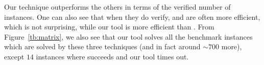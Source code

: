 Our technique outperforms the others in terms of the verified number of instances. One can also see that when they do verify, \deeppoly{} and \kpoly{} are often more efficient, which is not surprising, while our tool is more efficient than \deepsrgr{}. From Figure~\ref{tb:matrix}, we also see  that our tool solves all the benchmark instances which are solved by these three techniques (and in fact around $\sim 700$ more), %
except $14$ instances where \kpoly{} succeeds and our tool times out.









